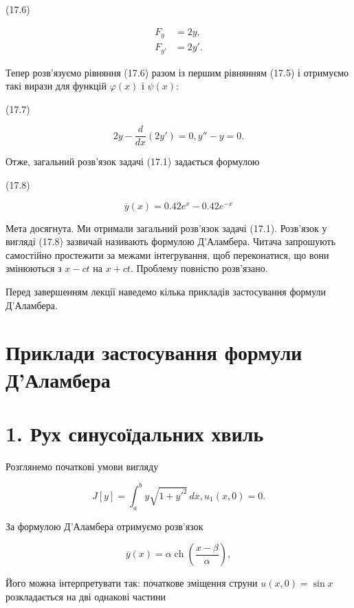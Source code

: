 \documentclass[
  ukrainian,
]{article}
\begin{document}
(17.6)

\[
\begin{aligned}
F_y &= 2y, \\
F_{y'} &= 2y'.
\end{aligned}
\]

Тепер розв'язуємо рівняння (17.6) разом із першим рівнянням (17.5) і
отримуємо такі вирази для функцій \(\varphi(x)\) і \(\psi(x)\):

(17.7)

\[
2y - \frac{d}{dx}(2y') = 0,
y'' - y = 0.
\]

Отже, загальний розв'язок задачі (17.1) задається формулою

(17.8)

\[
\overline{y}(x) = 0.42e^x - 0.42e^{-x}
\]

Мета досягнута. Ми отримали загальний розв'язок задачі (17.1). Розв'язок
у вигляді (17.8) зазвичай називають формулою Д'Аламбера. Читача
запрошують самостійно простежити за межами інтегрування, щоб
переконатися, що вони змінюються з \(x-ct\) на \(x+ct\). Проблему
повністю розв'язано.

Перед завершенням лекції наведемо кілька прикладів застосування формули
Д'Аламбера.

\section{Приклади застосування формули
Д'Аламбера}\label{ux43fux440ux438ux43aux43bux430ux434ux438-ux437ux430ux441ux442ux43eux441ux443ux432ux430ux43dux43dux44f-ux444ux43eux440ux43cux443ux43bux438-ux434ux430ux43bux430ux43cux431ux435ux440ux430}

\section{1. Рух синусоїдальних
хвиль}\label{ux440ux443ux445-ux441ux438ux43dux443ux441ux43eux457ux434ux430ux43bux44cux43dux438ux445-ux445ux432ux438ux43bux44c}

Розглянемо початкові умови вигляду

\[
J[y] = \int_a^b y \sqrt{1 + y'^2} \, dx,
u_1(x, 0) = 0.
\]

За формулою Д'Аламбера отримуємо розв'язок

\[
\overline{y}(x) = \alpha \operatorname{ch}\left(\frac{x - \beta}{\alpha}\right),
\]

Його можна інтерпретувати так: початкове зміщення струни
\(u(x, 0) = \sin x\) розкладається на дві однакові частини
\end{document}
